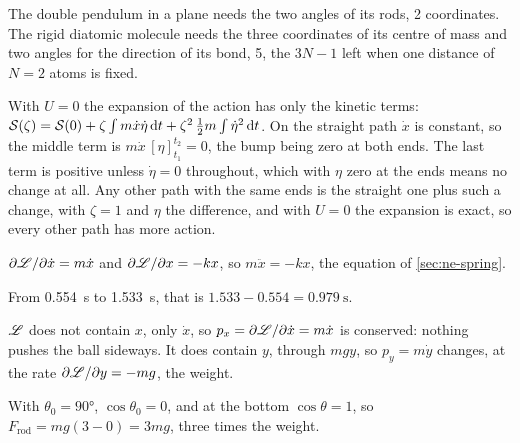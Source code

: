 \label{sec:la-answers}

The double pendulum in a plane needs the two
angles of its rods, 2 coordinates. The rigid diatomic molecule needs the
three coordinates of its centre of mass and two angles for the direction
of its bond, 5, the $3N - 1$ left when one distance of $N = 2$ atoms is
fixed.

With $U = 0$ the expansion of the action has only
the kinetic terms: $\mathcal{S}(\zeta) = \mathcal{S}(0) + \zeta\int m\dot{x}\dot\eta\,
\mathrm{d} t + \zeta^2\,\frac12 m\int\dot\eta^2\,\mathrm{d} t$. On the straight path
$\dot{x}$ is constant, so the middle term is $m\dot{x}\,[\eta]_{t_1}^{t_2}
= 0$, the bump being zero at both ends. The last term is positive unless
$\dot\eta = 0$ throughout, which with $\eta$ zero at the ends means no
change at all. Any other path with the same ends is the straight one plus such a change,
with $\zeta = 1$ and $\eta$ the difference, and with $U = 0$ the expansion
is exact, so every other path has more action.

$\partial\mathscr{L}/\partial\dot{x} = m\dot{x}$ and
$\partial\mathscr{L}/\partial x = -kx$, so $m\ddot{x} = -kx$, the equation of
\cref{sec:ne-spring}.

From \SI{0.554}{\second} to
\SI{1.533}{\second}, that is $1.533 - 0.554 = \SI{0.979}{\second}$.

$\mathscr{L}$ does not contain $x$, only $\dot{x}$, so
$p_x = \partial\mathscr{L}/\partial\dot{x} = m\dot{x}$ is conserved: nothing
pushes the ball sideways. It does contain $y$, through $mgy$, so $p_y =
m\dot{y}$ changes, at the rate $\partial\mathscr{L}/\partial y = -mg$, the weight.

With $\theta_0 = \ang{90}$, $\cos\theta_0 =
0$, and at the bottom $\cos\theta = 1$, so $F_{\mathrm{rod}} = mg(3 - 0) =
3mg$, three times the weight.

